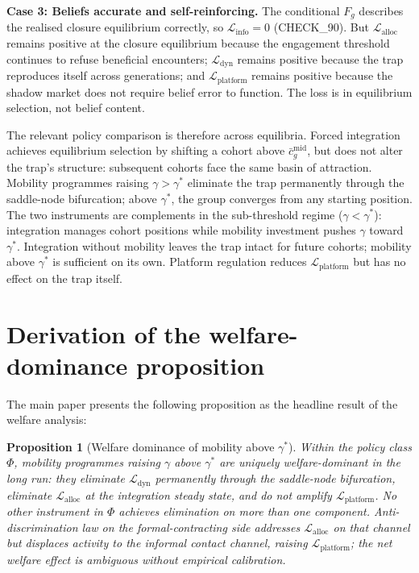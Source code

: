 \documentclass[12pt,a4paper]{article}
\newtheorem{proposition}{Proposition}
\theoremstyle{definition}
\numberwithin{proposition}{section}
\begin{document}
\textbf{Case 3: Beliefs accurate and self-reinforcing.}
The conditional $F_g$ describes the realised closure equilibrium
correctly, so $\mathcal{L}_{\text{info}} = 0$ (CHECK\_90). But
$\mathcal{L}_{\text{alloc}}$ remains positive at the closure
equilibrium because the engagement threshold continues to refuse
beneficial encounters; $\mathcal{L}_{\text{dyn}}$ remains positive
because the trap reproduces itself across generations; and
$\mathcal{L}_{\text{platform}}$ remains positive because the
shadow market does not require belief error to function. The loss
is in equilibrium selection, not belief content.

The relevant policy comparison is therefore across equilibria.
Forced integration achieves equilibrium selection by shifting a
cohort above $\bar{c}_g^{\mathrm{mid}}$, but does not alter the
trap's structure: subsequent cohorts face the same basin of
attraction. Mobility programmes raising $\gamma > \gamma^*$
eliminate the trap permanently through the saddle-node bifurcation;
above $\gamma^*$, the group converges from any starting position.
The two instruments are complements in the sub-threshold regime
($\gamma < \gamma^*$): integration manages cohort positions while
mobility investment pushes $\gamma$ toward $\gamma^*$. Integration
without mobility leaves the trap intact for future cohorts;
mobility above $\gamma^*$ is sufficient on its own. Platform
regulation reduces $\mathcal{L}_{\text{platform}}$ but has no
effect on the trap itself.

\section{Derivation of the welfare-dominance proposition}
\label{sec:welfare-dominance}

The main paper presents the following proposition as the headline
result of the welfare analysis:

\begin{proposition}[Welfare dominance of mobility above $\gamma^*$]
\label{prop:dominance}
Within the policy class $\Phi$, mobility programmes raising
$\gamma$ above $\gamma^*$ are uniquely welfare-dominant in the long
run: they eliminate $\mathcal{L}_{\mathrm{dyn}}$ permanently
through the saddle-node bifurcation, eliminate
$\mathcal{L}_{\mathrm{alloc}}$ at the integration steady state, and
do not amplify $\mathcal{L}_{\mathrm{platform}}$. No other
instrument in $\Phi$ achieves elimination on more than one
component. Anti-discrimination law on the formal-contracting side
addresses $\mathcal{L}_{\mathrm{alloc}}$ on that channel but
displaces activity to the informal contact channel, raising
$\mathcal{L}_{\mathrm{platform}}$; the net welfare effect is
ambiguous without empirical calibration.
\end{proposition}
\end{document}
